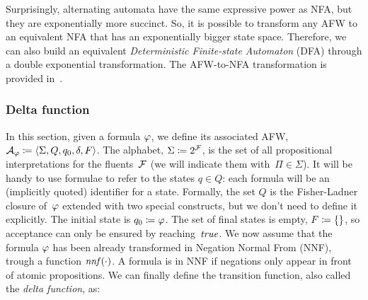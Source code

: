 Surprisingly, alternating automata have the same expressive power as NFA, but
they are exponentially more succinct. So, it is possible to transform any AFW
to an equivalent NFA that has an exponentially bigger state space. Therefore,
we can also build an equivalent \emph{Deterministic Finite-state Automaton}
(DFA) through a double
exponential transformation. The AFW-to-NFA transformation is provided
in~\cite{bib:temp-logic-automata}.


\subsubsection{Delta function}

In this section, given a \ldl{} formula $\varphi$, we define its associated
AFW, $\mathcal{A}_\varphi \coloneqq \langle \Sigma, Q, q_0, \delta, F
\rangle$. The alphabet, $\Sigma \coloneqq 2^{\mathcal{F}}$, is the set of all
propositional interpretations for the fluents~$\mathcal{F}$ (we will indicate
them with~$\Pi \in \Sigma$). It will be handy to use \ldl{} formulae to refer
to the states $q \in Q$: each formula will be an (implicitly quoted)
identifier for a state. Formally, the set $Q$ is the Fisher-Ladner closure
of~$\varphi$ extended with two special constructs, but we don't need to
define it explicitly. The initial state is $q_0 \coloneqq \varphi$. The set
of final states is empty, $F \coloneqq \{\}$, so acceptance can only be
ensured by reaching~$\text{\textit{true}}$. We now assume that the formula $\varphi$ has
been already transformed in Negation Normal From
(NNF), trough a function
$\text{\textit{nnf}}(\cdot)$. A formula is in NNF if negations only appear in front of
atomic propositions. We can finally define the transition function, also
called the \emph{delta function}, as:
\begingroup
\allowdisplaybreaks
